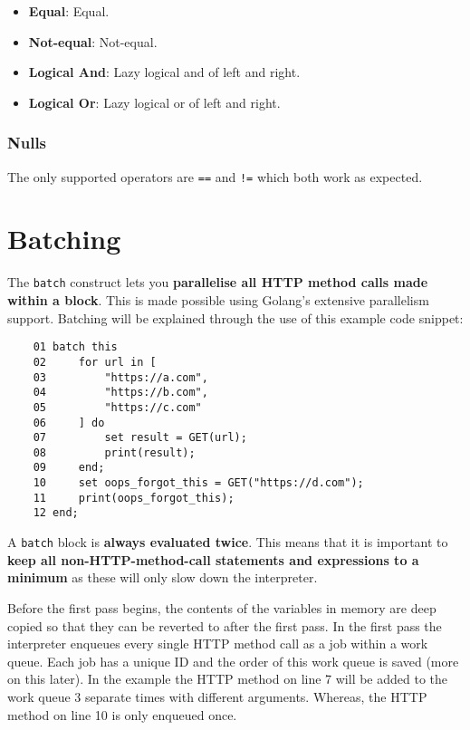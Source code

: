\documentclass[12pt, letterpaper]{article}
\begin{document}
\begin{itemize}
    \item \textbf{Equal}: Equal.
    \item \textbf{Not-equal}: Not-equal.
    \item \textbf{Logical And}: Lazy logical and of left and right.
    \item \textbf{Logical Or}: Lazy logical or of left and right.
\end{itemize}

\subsubsection{Nulls}

The only supported operators are \verb|==| and \verb|!=| which both work as expected.

\section{Batching}

The \verb|batch| construct lets you \textbf{parallelise all HTTP method calls made within a block}. This is made possible using Golang's extensive parallelism support. Batching will be explained through the use of this example code snippet:

\begin{center}
    \begin{verbatim}
    01 batch this
    02     for url in [
    03         "https://a.com",
    04         "https://b.com",
    05         "https://c.com"
    06     ] do
    07         set result = GET(url);
    08         print(result);
    09     end;
    10     set oops_forgot_this = GET("https://d.com");
    11     print(oops_forgot_this);
    12 end;
    \end{verbatim}
\end{center}

A \verb|batch| block is \textbf{always evaluated twice}. This means that it is important to \textbf{keep all non-HTTP-method-call statements and expressions to a minimum} as these will only slow down the interpreter.

Before the first pass begins, the contents of the variables in memory are deep copied so that they can be reverted to after the first pass. In the first pass the interpreter enqueues every single HTTP method call as a job within a work queue. Each job has a unique ID and the order of this work queue is saved (more on this later). In the example the HTTP method on line 7 will be added to the work queue 3 separate times with different arguments. Whereas, the HTTP method on line 10 is only enqueued once.
\end{document}
